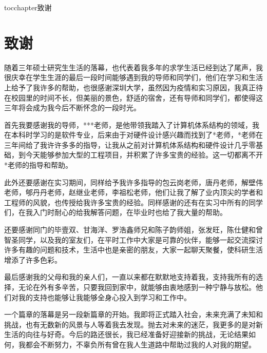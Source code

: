 
\newenvironment{theacknowledgements}{\wuhao\song}

\addcontentsline{toc}{chapter}{致谢}%
\chapter*{\centering\xiaosan\hei\bfseries 致\quad 谢}

\begin{theacknowledgements}
	
随着三年硕士研究生生活的落幕，也代表着我多年的求学生活已经到达了尾声，我很庆幸在学生生涯的最后一段时间能够遇到我的导师和同学们，他们在学习和生活上给予了我许多的帮助，也很感谢深圳大学，虽然因为疫情和实习原因，我真正待在校园里的时间不长，但美丽的景色，舒适的宿舍，还有导师和同学们，都使得这三年将会成为我今后不断怀念的一段时光。

首先我要感谢我的导师，***老师，是他带领我踏入了计算机体系结构的领域，我在本科时学习的是软件专业，后来由于对硬件设计感兴趣而找到了*老师，*老师在三年间给了我许许多多的指导，让我从之前对计算机体系结构和硬件设计几乎零基础，到今天能够参加大型的工程项目，并积累了许多宝贵的经验。这一切都离不开*老师的指导和帮助。

此外还要感谢在实习期间，同样给予我许多指导的包云岗老师，唐丹老师，解壁伟老师，郇丹丹老师，赵继业老师，李祖松老师，他们让我了解了业内顶尖的学者和工程师的风貌，也传授给我许多宝贵的经验。同样感谢的还有在实习中所有的同学们，在我入门时耐心的给我解答问题，在毕业时也给了我大量的帮助。

还要感谢同门的毕壹双、甘海洋、罗浩鑫师兄和陈子韵师姐，张发旺，陈仕健和曾智圣同学，以及我的室友们，在平时工作中大家是可靠的伙伴，能够一起交流探讨许多有趣的问题和技术，生活中也是亲密的朋友，大家一起聊天聚餐，使科研生活增添了许多色彩。

最后感谢我的父母和我的亲人们，一直以来都在默默地支持着我，支持我所有的选择，无论在外有多辛苦，只要我回到家中，就能够由衷地感到一种宁静与放松。他们对我的支持也能够让我能够全身心投入到学习和工作中。

一个篇章的落幕是另一段新篇章的开始。我即将正式踏入社会，未来充满了未知和挑战，也有无数新的风景与人等着我去发现。抛去对未来的迷茫，我更多的是对新生活的向往与好奇。今后的路还很长，我已经准备好迎接新的挑战，无论结果如何，我都会不断努力，不辜负所有曾在我人生道路中帮助过我的人对我的期望。

\end{theacknowledgements}





